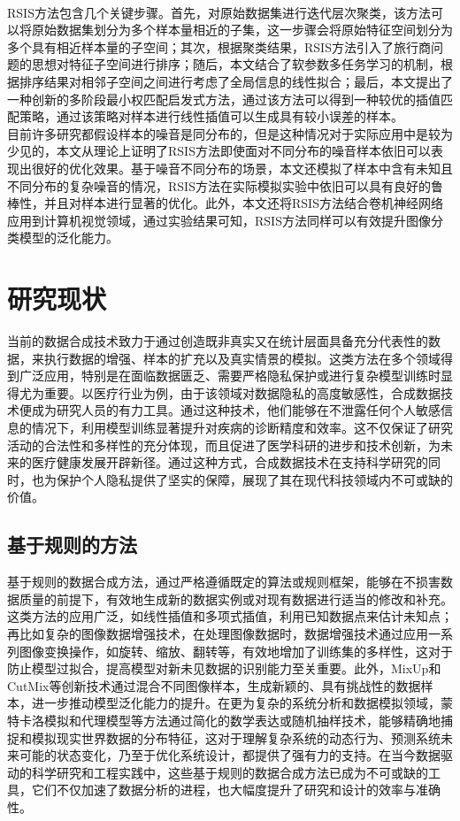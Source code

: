 \documentclass{NauThesis}
\begin{document}
\\\hspace*{2em}RSIS方法包含几个关键步骤。首先，对原始数据集进行迭代层次聚类，该方法可以将原始数据集划分为多个样本量相近的子集，这一步骤会将原始特征空间划分为多个具有相近样本量的子空间；其次，根据聚类结果，RSIS方法引入了旅行商问题的思想对特征子空间进行排序；随后，本文结合了软参数多任务学习的机制，根据排序结果对相邻子空间之间进行考虑了全局信息的线性拟合；最后，本文提出了一种创新的多阶段最小权匹配启发式方法，通过该方法可以得到一种较优的插值匹配策略，通过该策略对样本进行线性插值可以生成具有较小误差的样本。
\\\hspace*{2em}目前许多研究都假设样本的噪音是同分布的，但是这种情况对于实际应用中是较为少见的，本文从理论上证明了RSIS方法即使面对不同分布的噪音样本依旧可以表现出很好的优化效果。基于噪音不同分布的场景，本文还模拟了样本中含有未知且不同分布的复杂噪音的情况，RSIS方法在实际模拟实验中依旧可以具有良好的鲁棒性，并且对样本进行显著的优化。此外，本文还将RSIS方法结合卷机神经网络应用到计算机视觉领域，通过实验结果可知，RSIS方法同样可以有效提升图像分类模型的泛化能力。

\section{研究现状}
当前的数据合成技术致力于通过创造既非真实又在统计层面具备充分代表性的数据，来执行数据的增强、样本的扩充以及真实情景的模拟。这类方法在多个领域得到广泛应用，特别是在面临数据匮乏、需要严格隐私保护或进行复杂模型训练时显得尤为重要。以医疗行业为例，由于该领域对数据隐私的高度敏感性，合成数据技术便成为研究人员的有力工具。通过这种技术，他们能够在不泄露任何个人敏感信息的情况下，利用模型训练显著提升对疾病的诊断精度和效率\cite{ref16,ref17}。这不仅保证了研究活动的合法性和多样性的充分体现，而且促进了医学科研的进步和技术创新，为未来的医疗健康发展开辟新径。通过这种方式，合成数据技术在支持科学研究的同时，也为保护个人隐私提供了坚实的保障，展现了其在现代科技领域内不可或缺的价值。
\subsection{基于规则的方法}
基于规则的数据合成方法，通过严格遵循既定的算法或规则框架，能够在不损害数据质量的前提下，有效地生成新的数据实例或对现有数据进行适当的修改和补充。这类方法的应用广泛，如线性插值和多项式插值，利用已知数据点来估计未知点\cite{ref18,ref19}；再比如复杂的图像数据增强技术，在处理图像数据时，数据增强技术通过应用一系列图像变换操作，如旋转、缩放、翻转等，有效地增加了训练集的多样性，这对于防止模型过拟合，提高模型对新未见数据的识别能力至关重要。此外，MixUp和CutMix等创新技术通过混合不同图像样本，生成新颖的、具有挑战性的数据样本，进一步推动模型泛化能力的提升\cite{ref20,ref21}。在更为复杂的系统分析和数据模拟领域，蒙特卡洛模拟和代理模型等方法通过简化的数学表达或随机抽样技术，能够精确地捕捉和模拟现实世界数据的分布特征，这对于理解复杂系统的动态行为、预测系统未来可能的状态变化，乃至于优化系统设计，都提供了强有力的支持\cite{ref22,ref23,ref24}。在当今数据驱动的科学研究和工程实践中，这些基于规则的数据合成方法已成为不可或缺的工具，它们不仅加速了数据分析的进程，也大幅度提升了研究和设计的效率与准确性。
\end{document}
